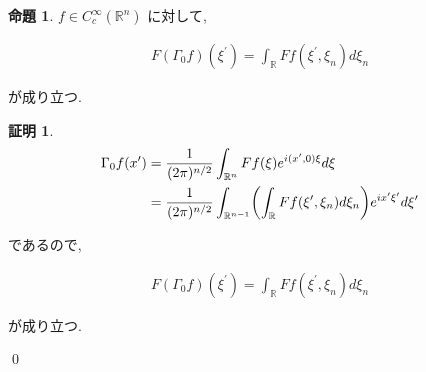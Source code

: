 \documentclass[10pt, fleqn, label-section=none]{bxjsarticle}
\theoremstyle{definition}
\newtheorem{prop}[dfn]{命題}
\newtheorem*{pf*}{証明}
\newcommand{\paren}[1]{\mleft( #1\mright )}
\renewcommand{\;}{\, ; \,}
\begin{document}
\begin{prop}$f \in C_c^\infty (\mathbb R^n)$ に対して, 

\begin{align*} F(\Gamma_0 f) (\xi ^\prime) = \int_{\mathbb R} Ff(\xi^\prime, \xi_n) d\xi_n \end{align*}

が成り立つ. 

\end{prop}
\begin{pf*}

\begin{align*} \Gamma_0 f (x^\prime) &= \frac{1}{(2 \pi)^{n/2}} \int_{\mathbb R^n} Ff(\xi)e^{i(x^\prime, 0) \xi} d\xi 
\\& = \frac{1}{(2 \pi)^{n/2}} \int_{\mathbb R^{n-1}} \paren{\int_{\mathbb R}Ff(\xi^\prime, \xi_n) d\xi_n }e^{ix^\prime \xi ^\prime} d\xi^\prime  \end{align*}

であるので, 

\begin{align*} F(\Gamma_0 f) (\xi ^\prime) = \int_{\mathbb R} Ff(\xi^\prime, \xi_n) d\xi_n \end{align*}

が成り立つ. 


\qed
\end{pf*}
\end{document}
